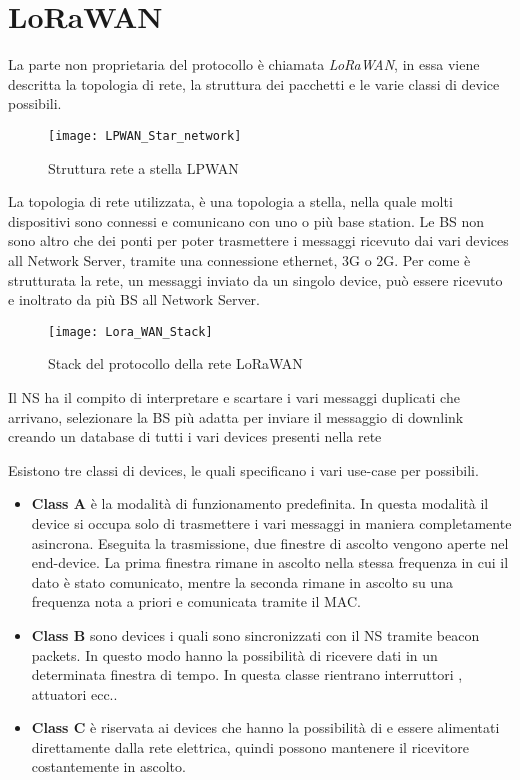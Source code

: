 \section{LoRaWAN}
La parte non proprietaria del protocollo è chiamata \emph{LoRaWAN}, in essa
viene descritta la topologia di rete, la struttura dei pacchetti e le varie
classi di device possibili.

\begin{figure}[h]
\centering 
\texttt{[image: LPWAN\_Star\_network]}
\caption{Struttura rete a stella LPWAN}
\end{figure}

La topologia di rete utilizzata, è una topologia a stella, nella quale molti
dispositivi sono connessi e comunicano con uno o più base station. Le BS non
sono altro che dei ponti per poter trasmettere i messaggi ricevuto dai vari
devices all Network Server, tramite una connessione ethernet, 3G o 2G. 
Per come è strutturata la rete, un messaggi inviato
da un singolo device, può essere ricevuto e inoltrato da più BS all Network
Server.

\begin{figure}[h]
\centering 
\texttt{[image: Lora\_WAN\_Stack]}
\caption{Stack del protocollo della rete LoRaWAN}
\end{figure}

Il NS ha il compito di interpretare e scartare i vari messaggi duplicati che
arrivano, selezionare la BS più adatta per inviare il messaggio di downlink
creando un database di tutti i vari devices presenti nella rete 


Esistono tre classi di devices, le quali specificano i vari use-case per
possibili.
\begin{itemize}
\item \textbf{Class A} è la modalità di funzionamento predefinita. In questa
modalità il device si occupa solo di trasmettere i vari messaggi in maniera
completamente asincrona. Eseguita la trasmissione, due finestre di ascolto
vengono aperte nel end-device. La prima finestra rimane in ascolto nella stessa
frequenza in cui il dato è stato comunicato, mentre la seconda rimane in ascolto
su una frequenza nota a priori e comunicata tramite il MAC.
\item \textbf{Class B} sono devices i quali sono sincronizzati con il NS tramite
beacon packets. In questo modo hanno la possibilità di ricevere dati in un
determinata finestra di tempo. In questa classe rientrano interruttori ,
attuatori ecc..
\item \textbf{Class C} è riservata ai devices che hanno la possibilità di e
essere alimentati direttamente dalla rete elettrica, quindi possono mantenere il
ricevitore costantemente in ascolto.
\end{itemize}


